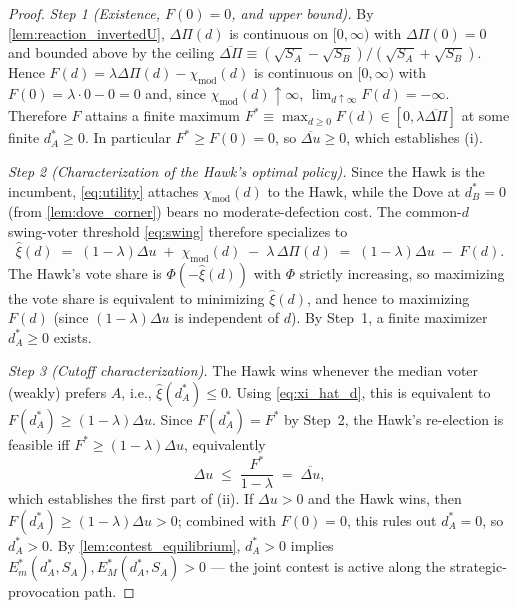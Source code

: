 \begin{proof}
\textit{Step 1 (Existence, $F(0)=0$, and upper bound).}
By \autoref{lem:reaction_invertedU}, $\Delta\Pi(d)$ is continuous on $[0,\infty)$ with $\Delta\Pi(0)=0$ and bounded above by the ceiling $\overline{\Delta\Pi}\equiv(\sqrt{S_A}-\sqrt{S_B})/(\sqrt{S_A}+\sqrt{S_B})$. Hence $F(d)=\lambda\Delta\Pi(d)-\chi_{\mathrm{mod}}(d)$ is continuous on $[0,\infty)$ with $F(0)=\lambda\cdot 0-0=0$ and, since $\chi_{\mathrm{mod}}(d)\uparrow\infty$, $\lim_{d\uparrow\infty}F(d)=-\infty$. Therefore $F$ attains a finite maximum $F^*\equiv\max_{d\ge 0}F(d)\in[0,\lambda\overline{\Delta\Pi}]$ at some finite $d_A^*\ge 0$. In particular $F^*\ge F(0)=0$, so $\overline{\Delta u}\ge 0$, which establishes (i).

\textit{Step 2 (Characterization of the Hawk's optimal policy).}
Since the Hawk is the incumbent, \autoref{eq:utility} attaches $\chi_{\mathrm{mod}}(d)$ to the Hawk, while the Dove at $d_B^*=0$ (from \autoref{lem:dove_corner}) bears no moderate-defection cost. The common-$d$ swing-voter threshold \autoref{eq:swing} therefore specializes to
\begin{equation} \label{eq:xi_hat_d}
\hat{\xi}(d)\;=\;(1-\lambda)\Delta u\;+\;\chi_{\mathrm{mod}}(d)\;-\;\lambda\,\Delta\Pi(d)\;=\;(1-\lambda)\Delta u\;-\;F(d).
\end{equation}
The Hawk's vote share is $\Phi(-\hat{\xi}(d))$ with $\Phi$ strictly increasing, so maximizing the vote share is equivalent to minimizing $\hat{\xi}(d)$, and hence to maximizing $F(d)$ (since $(1-\lambda)\Delta u$ is independent of $d$). By Step~1, a finite maximizer $d_A^*\ge 0$ exists.

\textit{Step 3 (Cutoff characterization).}
The Hawk wins whenever the median voter (weakly) prefers $A$, i.e., $\hat{\xi}(d_A^*)\le 0$. Using \autoref{eq:xi_hat_d}, this is equivalent to $F(d_A^*)\ge (1-\lambda)\Delta u$. Since $F(d_A^*)=F^*$ by Step~2, the Hawk's re-election is feasible iff $F^*\ge (1-\lambda)\Delta u$, equivalently
\[
\Delta u\;\le\;\frac{F^*}{1-\lambda}\;=\;\overline{\Delta u},
\]
which establishes the first part of (ii). If $\Delta u>0$ and the Hawk wins, then $F(d_A^*)\ge (1-\lambda)\Delta u>0$; combined with $F(0)=0$, this rules out $d_A^*=0$, so $d_A^*>0$. By \autoref{lem:contest_equilibrium}, $d_A^*>0$ implies $E_m^*(d_A^*,S_A),E_M^*(d_A^*,S_A)>0$ — the joint contest is active along the strategic-provocation path.


\end{proof}

